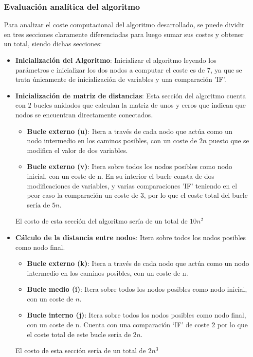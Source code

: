 \subsubsection*{Evaluación analítica del algoritmo}

Para analizar el coste computacional del algoritmo desarrollado, se puede dividir en tres secciones claramente diferenciadas para luego sumar sus costes y obtener un total, siendo dichas secciones: 
\begin{itemize}
    \item \textbf{Inicialización del Algoritmo}: Inicializar el algoritmo leyendo los parámetros e inicializar los dos nodos a computar el coste es de 7, ya que se trata únicamente de inicialización de variables y una comparación 'IF'.
    
    \item \textbf{Inicialización de matriz de distancias}: Esta sección del algoritmo cuenta con 2 bucles anidados que calculan la matriz de unos y ceros que indican que nodos se encuentran directamente conectados.
    \begin{itemize}
        \item \textbf{Bucle externo (u)}: Itera a través de cada nodo que actúa como un nodo intermedio en los caminos posibles, con un coste de $2n$ puesto que se modifica el valor de dos variables.
        \item \textbf{Bucle externo (v)}: Itera sobre todos los nodos posibles como nodo inicial, con un coste de n. En su interior el bucle consta de dos modificaciones de variables, y varias comparaciones 'IF' teniendo en el peor caso la comparación un coste de 3, por lo que el coste total del bucle sería de $5n$.
    \end{itemize}
    El costo de esta sección del algoritmo sería de un total de $10n^2$

    \item \textbf{Cálculo de la distancia entre nodos}: Itera sobre todos los nodos posibles como nodo final.
    \begin{itemize}
        \item \textbf{Bucle externo (k)}: Itera a través de cada nodo que actúa como un nodo intermedio en los caminos posibles, con un coste de n.
        \item \textbf{Bucle medio (i)}: Itera sobre todos los nodos posibles como nodo inicial, con un coste de $n$.
        \item \textbf{Bucle interno (j)}: Itera sobre todos los nodos posibles como nodo final, con un coste de n. Cuenta con una comparación `IF' de coste 2 por lo que el coste total de este bucle sería de $2n$.
    \end{itemize}
    El costo de esta sección sería de un total de $2n^3$
    
\end{itemize}

